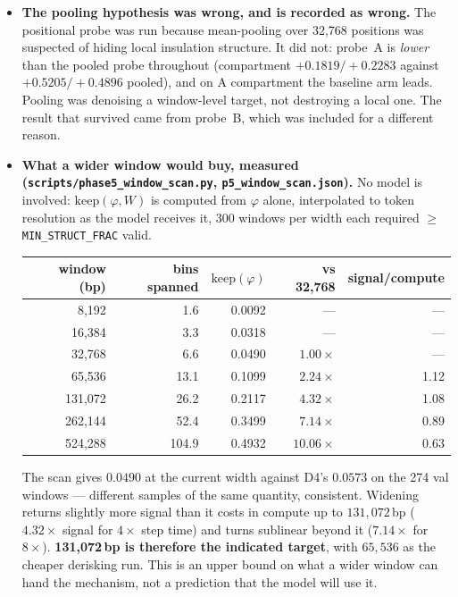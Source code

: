 \documentclass[11pt,a4paper]{article}
\newcommand{\code}[1]{\texttt{\small #1}}
\begin{document}
\begin{itemize}
\item \textbf{The pooling hypothesis was wrong, and is recorded as wrong.} The
positional probe was run because mean-pooling over 32{,}768 positions was
suspected of hiding local insulation structure. It did not: probe~A is
\emph{lower} than the pooled probe throughout (compartment $+0.1819/+0.2283$
against $+0.5205/+0.4896$ pooled), and on A compartment the baseline arm leads.
Pooling was denoising a window-level target, not destroying a local one. The
result that survived came from probe~B, which was included for a different
reason.

\item \textbf{What a wider window would buy, measured
(\code{scripts/phase5\_window\_scan.py}, \code{p5\_window\_scan.json}).} No
model is involved: $\mathrm{keep}(\varphi, W)$ is computed from $\varphi$ alone,
interpolated to token resolution as the model receives it, 300 windows per width
each required $\ge$ \code{MIN\_STRUCT\_FRAC} valid.

\begin{center}
\begin{tabular}{rrrrr}
\toprule
window (bp) & bins spanned & $\mathrm{keep}(\varphi)$ & vs 32{,}768 & signal/compute \\
\midrule
8{,}192   &   1.6 & 0.0092 & --- & --- \\
16{,}384  &   3.3 & 0.0318 & --- & --- \\
32{,}768  &   6.6 & 0.0490 & $1.00\times$ & --- \\
65{,}536  &  13.1 & 0.1099 & $2.24\times$ & 1.12 \\
131{,}072 &  26.2 & 0.2117 & $4.32\times$ & 1.08 \\
262{,}144 &  52.4 & 0.3499 & $7.14\times$ & 0.89 \\
524{,}288 & 104.9 & 0.4932 & $10.06\times$ & 0.63 \\
\bottomrule
\end{tabular}
\end{center}

The scan gives $0.0490$ at the current width against D4's $0.0573$ on the 274
val windows --- different samples of the same quantity, consistent. Widening
returns slightly more signal than it costs in compute up to $131{,}072$\,bp
($4.32\times$ signal for $4\times$ step time) and turns sublinear beyond it
($7.14\times$ for $8\times$). \textbf{131{,}072\,bp is therefore the indicated
target}, with $65{,}536$ as the cheaper derisking run. This is an upper bound on
what a wider window can hand the mechanism, not a prediction that the model will
use it.

\end{itemize}
\end{document}
